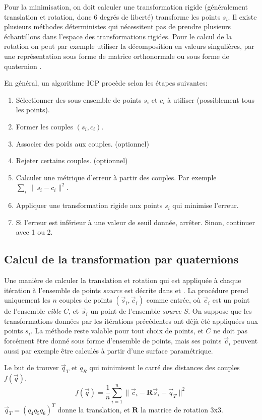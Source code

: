 \documentclass[a4paper,10pt]{scrreprt}
\begin{document}
Pour la minimisation, on doit calculer une transformation rigide (généralement translation et rotation, donc 6 degrés de liberté) transforme les points $s_i$. Il existe plusieurs méthodes déterministes qui nécessitent pas de prendre plusieurs échantillons dans l'espace des transformations rigides. Pour le calcul de la rotation on peut par exemple utiliser la décomposition en valeurs singulières, par une représentation sous forme de matrice orthonormale ou sous forme de quaternion \cite{Horn1986}.

En général, un algorithme ICP procède selon les étapes suivantes:
\begin{enumerate}
	\item Sélectionner des sous-ensemble de points ${s_i}$ et ${c_i}$ à utiliser (possiblement tous les points).
	\item Former les couples $(s_i, c_i)$.
	\item Associer des poids aux couples. (optionnel)
	\item Rejeter certains couples. (optionnel)
	\item Calculer une métrique d'erreur à partir des couples. Par exemple $\sum_{i} \|\ s_i - c_i \|^2$.
	\item Appliquer une transformation rigide aux points ${s_i}$ qui minimise l'erreur.
	\item Si l'erreur est inférieur à une valeur de seuil donnée, arrêter. Sinon, continuer avec 1 ou 2. 
\end{enumerate}


\subsection{Calcul de la transformation par quaternions} \label{sec:quat_trans}
Une manière de calculer la translation et rotation qui est appliquée à chaque itération à l'ensemble de points \emph{source} est décrite dans \cite{Besl1992} et \cite{Horn1986}. La procédure prend uniquement les $n$ couples de points $(\vec{s}_i, \vec{c}_i)$ comme entrée, où $\vec{c}_i$ est un point de l'ensemble \emph{cible} $C$, et $\vec{s}_i$ un point de l'ensemble \emph{source} $S$. On suppose que les transformations données par les itérations précédentes ont déjà été appliquées aux points $s_i$. La méthode reste valable pour tout choix de points, et $C$ ne doit pas forcément être donné sous forme d'ensemble de points, mais ses points $\vec{c}_i$ peuvent aussi par exemple être calculés à partir d'une surface paramétrique.

Le but de trouver $\vec{q}_T$ et $\dot{q}_R$ qui minimisent le carré des distances des couples $f(\vec{q})$.
\begin{equation}
	f(\vec{q}) = \frac{1}{n} \sum_{i=1}^{n} \| \vec{c}_i - \mathbf{R} \vec{s}_i - \vec{q}_T \|^2
\end{equation}
$\vec{q}_T = (q_4 q_5 q_6)^T$ donne la translation, et $\mathbf{R}$ la matrice de rotation 3x3.
\end{document}
